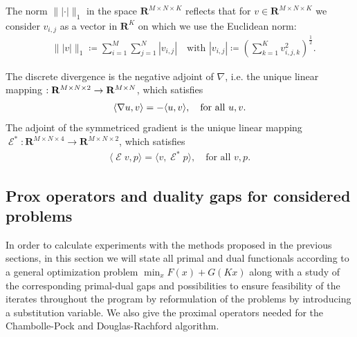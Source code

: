 \documentclass[twocolumn,envcountsame]{svjour3}
\newcommand{\RR}{\mathbf{R}}
\let\div\relax
\DeclareMathOperator{\div}{div}
\DeclareMathOperator{\symgrad}{\mathcal{E}}
\begin{document}
  The norm $\| |\cdot |\|_1$ in the space $\RR^{M\times N\times K}$ 
  reflects that for
  $v\in\RR^{M\times N \times K}$ we consider $v_{i,j}$ as a vector in $\RR^K$ on which we use
  the Euclidean norm:
  \begin{align*}
    &\||v|\|_1\coloneqq\sum_{i=1}^M\sum_{j=1}^N|v_{i,j}|\quad\text{with
    }|v_{i,j}|\coloneqq\left(\sum_{k=1}^Kv_{i,j,k}^2\right)^{\frac{1}{2}}.
  \end{align*}

  The discrete divergence is the negative adjoint of $\nabla$, i.e. the unique linear mapping
  $ \div: \RR^{M\times N \times 2}
  \to\RR^{M\times N}$, which satisfies
  \begin{align*}
    \langle\nabla u,v\rangle=-\langle u,\div v\rangle,\quad\text{for all }u,v.
  \end{align*}
  The adjoint of the symmetriced gradient is the unique linear mapping
  $ \symgrad^*: \RR^{M\times N \times 4}
  \to\RR^{M\times N \times 2}$, which satisfies
  \begin{align*}
    \langle\symgrad v,p\rangle=\langle v,\symgrad^* p\rangle,\quad\text{for all }v,p.
  \end{align*}
  


\subsection{Prox operators and duality gaps for considered problems}
\label{sec:proxdual}
%
In order to calculate experiments with the methods proposed in the previous 
sections, in this section we will state all 
primal and dual functionals according to a general optimization 
problem $\min_x F(x) + G(Kx)$ along with a study of the 
corresponding primal-dual gaps and possibilities to ensure 
feasibility of the iterates throughout the program by 
reformulation of the problems by introducing a substitution 
variable. We also give the proximal operators needed for the Chambolle-Pock and Douglas-Rachford
algorithm.
%
\end{document}
